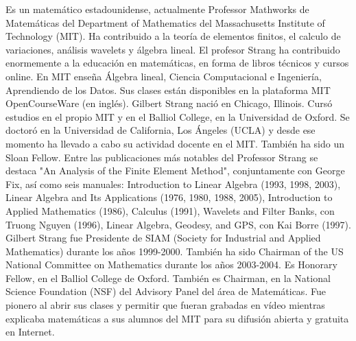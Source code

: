 \begin{parchment} {Es un matemático estadounidense, actualmente Professor Mathworks de Matemáticas del Department of Mathematics del Massachusetts Institute of Technology (MIT). Ha contribuido a la teoría de elementos finitos, el calculo de variaciones, análisis wavelets y álgebra lineal. El profesor Strang ha contribuido enormemente a la educación en matemáticas, en forma de libros técnicos y cursos online. En MIT enseña Álgebra lineal, Ciencia Computacional e Ingeniería, Aprendiendo de los Datos. Sus clases están disponibles en la plataforma MIT OpenCourseWare (en inglés).
Gilbert Strang nació en Chicago, Illinois. Cursó estudios en el propio MIT y en el Balliol College, en la Universidad de Oxford. Se doctoró en la Universidad de California, Los Ángeles (UCLA) y desde ese momento ha llevado a cabo su actividad docente en el MIT. También ha sido un Sloan Fellow. Entre las publicaciones más notables del Professor Strang se destaca "An Analysis of the Finite Element Method", conjuntamente con George Fix, así como seis manuales:
Introduction to Linear Algebra (1993, 1998, 2003),
Linear Algebra and Its Applications (1976, 1980, 1988, 2005),
Introduction to Applied Mathematics (1986),
Calculus (1991),
Wavelets and Filter Banks, con Truong Nguyen (1996),
Linear Algebra, Geodesy, and GPS, con Kai Borre (1997).
Gilbert Strang fue Presidente de SIAM (Society for Industrial and Applied Mathematics) durante los años 1999-2000. También ha sido Chairman of the US National Committee on Mathematics durante los años 2003-2004. Es Honorary Fellow, en el Balliol College de Oxford. También es Chairman, en la National Science Foundation (NSF) del Advisory Panel del área de Matemáticas.
Fue pionero al abrir sus clases y permitir que fueran grabadas en vídeo mientras explicaba matemáticas a sus alumnos del MIT para su difusión abierta y gratuita en Internet.}
\end{parchment}
	
	




